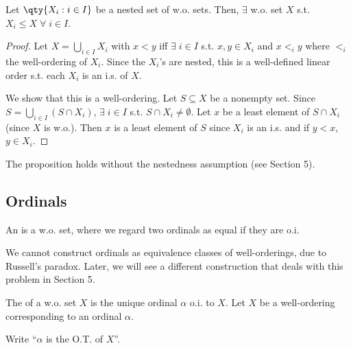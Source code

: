 \begin{proposition} \label{prp:8}
    Let $\qty{X_i : i \in I}$ be a nested set of w.o. sets.
    Then, $\exists$ w.o. set $X$ s.t. $X_i \leq X \; \forall \; i \in I$.
\end{proposition}

\begin{proof}
    Let $X = \bigcup_{i \in I} X_i$ with $x < y$ iff $\exists \; i \in I$ s.t. $x, y \in X_i$ and $x <_i y$ where $<_i$ the well-ordering of $X_i$.
    Since the $X_i$'s are nested, this is a well-defined linear order s.t. each $X_i$ is an i.s. of $X$.

    We show that this is a well-ordering.
    Let $S \subseteq X$ be a nonempty set.
    Since $S = \bigcup_{i \in I} (S \cap X_i)$, $\exists \; i \in I$ s.t. $S \cap X_i \neq \emptyset$.
    Let $x$ be a least element of $S \cap X_i$ (since $X$ is w.o.).
    Then $x$ is a least element of $S$ since $X_i$ is an i.s. and if $y < x$, $y \in X_i$.
\end{proof}

\begin{remark}
    The proposition holds without the nestedness assumption (see Section 5).
\end{remark}

\subsection{Ordinals}
\begin{definition}[Ordinal]
    An  is a w.o. set, where we regard two ordinals as equal if they are o.i.
\end{definition}

\begin{remark}
    We cannot construct ordinals as equivalence classes of well-orderings, due to Russell's paradox.
    Later, we will see a different construction that deals with this problem in Section 5.
\end{remark}

\begin{definition}
    The  of a w.o. set $X$ is the unique ordinal $\alpha$ o.i. to $X$.
    Let $X$ be a well-ordering corresponding to an ordinal $\alpha$.
\end{definition}

\begin{notation}
    Write ``$\alpha$ is the O.T. of $X$''.
\end{notation}

